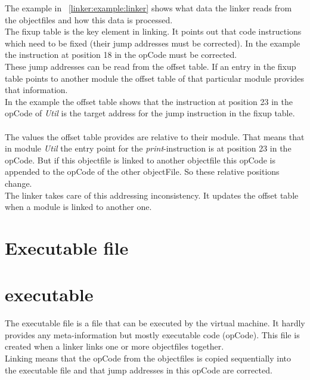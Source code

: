 The example in ~\ref{linker:example:linker} shows what data the linker reads from the
objectfiles and how this data is processed. \\
The fixup table is the key element in linking. It points out that code
instructions which need to be fixed (their jump addresses must be corrected).
In the example the instruction at position 18 in the opCode must be corrected. \\
These jump addresses can be read from the offset table. If an entry in the fixup
table points to another module the offset table of that particular module
provides that information.  \\
In the example the offset table shows that the instruction at position 23 in the
opCode of \emph{Util} is the target address for the jump instruction in the
fixup table. \\
\\
The values the offset table provides are relative to their module. That means
that in module \emph{Util} the entry point for the \emph{print}-instruction is
at position 23 in the opCode. But if this objectfile is linked to another
objectfile this opCode is appended to the opCode of the other objectFile. So
these relative positions change. \\
The linker takes care of this addressing inconsistency. It updates the offset
table when a module is linked to another one. 


\section{Executable file}
\section{executable}
The executable file is a file that can be executed by the virtual machine. It hardly
provides any meta-information but mostly executable code (opCode). This file is
created when a linker links one or more objectfiles together. \\
Linking means that the opCode from the objectfiles is copied sequentially into the
executable file and that jump addresses in this opCode are corrected. 

